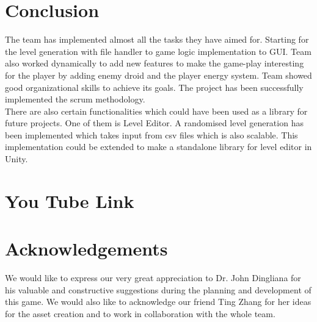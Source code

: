 \documentclass[11pt]{article}
\begin{document}
\section{Conclusion}
The team has implemented almost all the tasks they have aimed for. Starting for the level generation with file handler to game logic implementation to GUI. Team also worked dynamically to add new features to make the game-play interesting for the player by adding enemy droid and the player energy system. Team showed good organizational skills to achieve its goals. The project has been successfully implemented the scrum methodology.\\

There are also certain functionalities which could have been used as a library for future projects. One of them is Level Editor. A randomised level generation has been implemented which takes input from csv files which is also scalable. This implementation could be extended to make a standalone library for level editor in Unity.
\section{You Tube Link}

\section{Acknowledgements}
We would like to express our very great appreciation to Dr. John Dingliana for his valuable and constructive suggestions during the planning and development of this game. We would also like to acknowledge our friend Ting Zhang for her ideas for the asset creation and to work in collaboration with the whole team.  
\end{document}
